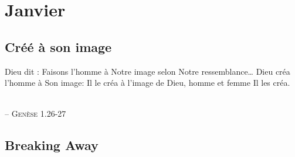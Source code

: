 \documentclass{scrbook}
\let\oldchapter\chapter
\newcommand\temphead{}
\newcommand\chaphead{}
\renewcommand\chapter[2][\temphead]{%
    \renewcommand\temphead{#2}%
    \renewcommand\chaphead{#2}%
    \oldchapter[#1]{#2}}
\newcommand{\myquote}[2]{\begin{center}\begin{itshape}#1\end{itshape}\\
 -- \textsc{#2}\end{center}}
\begin{document}
\chapter{Janvier}
\section{Créé à son image}

\myquote{
Dieu dit : \og Faisons l'homme à Notre image selon Notre ressemblance\dots\fg{} 
Dieu créa l'homme à Son image: Il le créa à l'image de Dieu, homme et femme Il les créa.
}{Genèse 1.26-27}


\lipsum


\section{Breaking Away}

\lipsum
\end{document}
